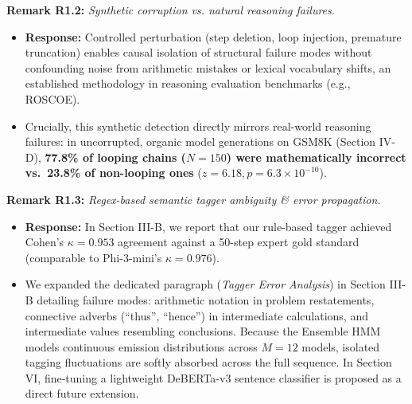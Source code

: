 \documentclass[11pt,a4paper]{article}
\begin{document}
\vspace{6pt}
\noindent\textbf{Remark R1.2:} \textit{Synthetic corruption vs. natural reasoning failures.}
\begin{itemize}[leftmargin=18pt]
    \item \textbf{Response:} Controlled perturbation (step deletion, loop injection, premature truncation) enables causal isolation of structural failure modes without confounding noise from arithmetic mistakes or lexical vocabulary shifts, an established methodology in reasoning evaluation benchmarks (e.g., ROSCOE).
    \item Crucially, this synthetic detection directly mirrors real-world reasoning failures: in uncorrupted, organic model generations on GSM8K (Section IV-D), \textbf{77.8\% of looping chains ($N=150$) were mathematically incorrect vs.\ 23.8\% of non-looping ones} ($z=6.18, p=6.3\times 10^{-10}$).
\end{itemize}

\vspace{6pt}
\noindent\textbf{Remark R1.3:} \textit{Regex-based semantic tagger ambiguity \& error propagation.}
\begin{itemize}[leftmargin=18pt]
    \item \textbf{Response:} In Section III-B, we report that our rule-based tagger achieved Cohen's $\kappa=0.953$ agreement against a 50-step expert gold standard (comparable to Phi-3-mini's $\kappa=0.976$).
    \item We expanded the dedicated paragraph (\textit{Tagger Error Analysis}) in Section III-B detailing failure modes: arithmetic notation in problem restatements, connective adverbs (``thus'', ``hence'') in intermediate calculations, and intermediate values resembling conclusions. Because the Ensemble HMM models continuous emission distributions across $M=12$ models, isolated tagging fluctuations are softly absorbed across the full sequence. In Section VI, fine-tuning a lightweight DeBERTa-v3 sentence classifier is proposed as a direct future extension.
\end{itemize}
\end{document}
